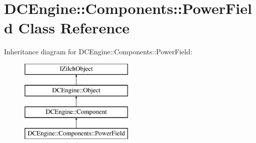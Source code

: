 \hypertarget{classDCEngine_1_1Components_1_1PowerField}{\section{D\-C\-Engine\-:\-:Components\-:\-:Power\-Field Class Reference}
\label{classDCEngine_1_1Components_1_1PowerField}
}
Inheritance diagram for D\-C\-Engine\-:\-:Components\-:\-:Power\-Field\-:\begin{figure}[H]
\begin{center}
\leavevmode
\includegraphics[height=4.000000cm]{classDCEngine_1_1Components_1_1PowerField}
\end{center}
\end{figure}
